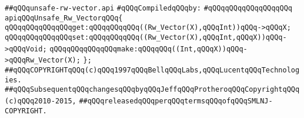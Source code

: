 \label{src/lib/std/src/unsafe/unsafe-rw-vector.api}
\verb|##qQQqunsafe-rw-vector.api|\newline
\newline
\verb|#qQQqCompiledqQQqby:|\newline
\verb|#qQQqqQQqqQQqqQQqqQQq|\newline
\newline
\newline
\newline
\verb|apiqQQqUnsafe_Rw_VectorqQQq{|\newline
\newline
\verb|qQQqqQQqqQQqqQQqget:qQQqqQQqqQQq((Rw_Vector(X),qQQqInt))qQQq->qQQqX;|\newline
\verb|qQQqqQQqqQQqqQQqset:qQQqqQQqqQQq((Rw_Vector(X),qQQqInt,qQQqX))qQQq->qQQqVoid;|\newline
\verb|qQQqqQQqqQQqqQQqmake:qQQqqQQq((Int,qQQqX))qQQq->qQQqRw_Vector(X);|\newline
\newline
\verb|};|\newline
\newline
\newline
\newline
\newline
\verb|##qQQqCOPYRIGHTqQQq(c)qQQq1997qQQqBellqQQqLabs,qQQqLucentqQQqTechnologies.|\newline
\verb|##qQQqSubsequentqQQqchangesqQQqbyqQQqJeffqQQqProtheroqQQqCopyrightqQQq(c)qQQq2010-2015,|\newline
\verb|##qQQqreleasedqQQqperqQQqtermsqQQqofqQQqSMLNJ-COPYRIGHT.|\newline

